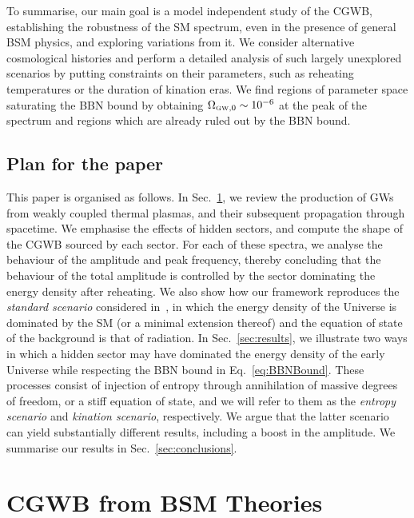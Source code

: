 \documentclass[a4paper,11pt]{article}
\begin{document}
To summarise, our main goal is a model independent study of the CGWB, establishing the robustness of the SM spectrum, even in the presence of general BSM physics, and exploring variations from it. We consider alternative cosmological histories  and perform a detailed analysis of such largely unexplored scenarios  by putting constraints on their parameters, such as reheating temperatures or the duration of kination eras. We find regions of parameter space saturating the BBN bound by obtaining $\Omega_{\text{\tiny{GW}}, 0} \sim 10^{-6}$ at the peak of the spectrum and regions which are already ruled out by the BBN bound.

\subsection*{Plan for the paper}

This paper is organised as follows.
In Sec.~\ref{sec:CGWBThermalPlasma},
we review the production of GWs from weakly coupled thermal plasmas, and their subsequent propagation through spacetime. 
We emphasise the effects of hidden sectors, and compute the shape of the CGWB sourced by each sector. 
For each of these spectra, we analyse the behaviour of the amplitude and peak frequency, thereby concluding that the behaviour of the total amplitude is controlled by the sector dominating the energy density after reheating.
We also show how our framework reproduces the \textit{standard scenario} considered in~\cite{Ghiglieri:2015nfa,Ghiglieri:2020mhm,Ringwald:2020ist}, in which the energy density of the Universe is dominated by the SM (or a minimal extension thereof) and the equation of state of the background is that of radiation.
In Sec.~\ref{sec:results},
we illustrate two ways in which a hidden sector may have dominated the energy density of the early Universe while respecting the BBN bound in Eq.~\eqref{eq:BBNBound}. These processes consist of injection of entropy through annihilation of massive degrees of freedom, or a stiff equation of state, and we will refer to them as the \textit{entropy scenario} and \textit{kination scenario}, respectively. We argue that the latter scenario can yield substantially different results, including a boost in the amplitude.
We summarise our results in Sec.~\ref{sec:conclusions}.

\section{CGWB from BSM Theories}\label{sec:CGWBThermalPlasma}
\end{document}
